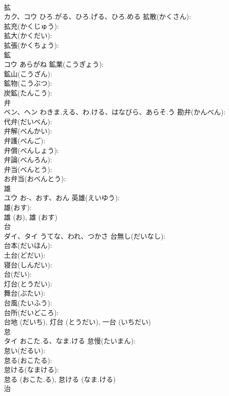 \documentclass[8pt]{extreport}
\begin{document}
\begin{CJK}{UTF8}{min}
\\	拡			
\\	カク、コウ	ひろ.がる、ひろ.げる、ひろ.める	拡散(かくさん): 
\\	拡充(かくじゅう): 
\\	拡大(かくだい): 
\\	拡張(かくちょう): 
\\	鉱			
\\	コウ	あらがね	鉱業(こうぎょう): 
\\	鉱山(こうざん): 
\\	鉱物(こうぶつ): 
\\	炭鉱(たんこう): 
\\	弁			
\\	ベン、ヘン	わきま.える、わ.ける、はなびら、あらそ.う	勘弁(かんべん): 
\\	代弁(だいべん): 
\\	弁解(べんかい): 
\\	弁護(べんご): 
\\	弁償(べんしょう): 
\\	弁論(べんろん): 
\\	弁当(べんとう): 
\\	お弁当(おべんとう): 
\\	雄			
\\	ユウ	お-、おす、おん	英雄(えいゆう): 
\\	雄(おす): 
\\	雄 (お), 雄 (おす)
\\	台			
\\	ダイ、タイ	うてな、われ、つかさ	台無し(だいなし): 
\\	台本(だいほん): 
\\	土台(どだい): 
\\	寝台(しんだい): 
\\	台(だい): 
\\	灯台(とうだい): 
\\	舞台(ぶたい): 
\\	台風(たいふう): 
\\	台所(だいどころ): 
\\	台地 (だいち), 灯台 (とうだい), 一台 (いちだい)
\\	怠			
\\	タイ	おこた.る、なま.ける	怠慢(たいまん): 
\\	怠い(だるい): 
\\	怠る(おこたる): 
\\	怠ける(なまける): 
\\	怠る (おこた.る), 怠ける (なま.ける)
\\	治			

\end{CJK}
\end{document}
